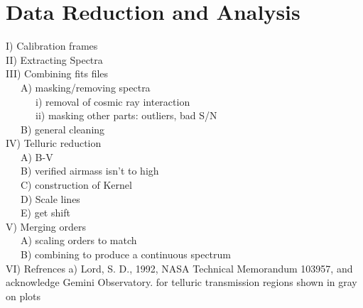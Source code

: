 \section{Data Reduction and Analysis}


I) Calibration frames\\

II) Extracting Spectra\\

III) Combining fits files\\
~~~A) masking/removing spectra\\
~~~~~~i) removal of cosmic ray interaction\\
~~~~~~ii) masking other parts: outliers, bad S/N\\
~~~B) general cleaning\\

IV) Telluric reduction\\
~~~A) B-V\\
~~~B) verified airmass isn't to high\\
~~~C) construction of Kernel\\
~~~D) Scale lines\\
~~~E) get shift\\

V) Merging orders\\
~~~A) scaling orders to match\\
~~~B) combining to produce a continuous spectrum\\

VI) Refrences
  a) Lord, S. D., 1992, NASA Technical Memorandum 103957, and acknowledge Gemini Observatory.
  for telluric transmission regions shown in gray on plots
  
  
  
  
  